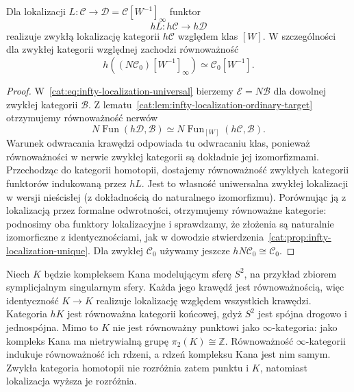 \begin{twierdzenie}\label{cat:thm:infty-localization-homotopy}
Dla lokalizacji $L:\mathcal C\to\mathcal D=\mathcal C[W^{-1}]_\infty$ funktor
\[
 hL:h\mathcal C\to h\mathcal D
\]
realizuje zwykłą lokalizację kategorii $h\mathcal C$ względem klas $[W]$. W szczególności dla zwykłej kategorii względnej zachodzi równoważność
\[
 h((N\mathcal C_0)[W^{-1}]_\infty)\simeq \mathcal C_0[W^{-1}].
\]
\end{twierdzenie}
\begin{proof}
W~\eqref{cat:eq:infty-localization-universal} bierzemy $\mathcal E=N\mathcal B$ dla dowolnej zwykłej kategorii $\mathcal B$. Z lematu~\ref{cat:lem:infty-localization-ordinary-target} otrzymujemy równoważność nerwów
\[
 N\operatorname{Fun}(h\mathcal D,\mathcal B)
 \simeq N\operatorname{Fun}_{[W]}(h\mathcal C,\mathcal B).
\]
Warunek odwracania krawędzi odpowiada tu odwracaniu klas, ponieważ równoważności w nerwie zwykłej kategorii są dokładnie jej izomorfizmami. Przechodząc do kategorii homotopii, dostajemy równoważność zwykłych kategorii funktorów indukowaną przez $hL$. Jest to własność uniwersalna zwykłej lokalizacji w wersji nieścisłej (z dokładnością do naturalnego izomorfizmu). Porównując ją z lokalizacją przez formalne odwrotności, otrzymujemy równoważne kategorie: podnosimy oba funktory lokalizacyjne i sprawdzamy, że złożenia są naturalnie izomorficzne z identycznościami, jak w dowodzie stwierdzenia~\ref{cat:prop:infty-localization-unique}. Dla zwykłej $\mathcal C_0$ używamy jeszcze $hN\mathcal C_0\cong\mathcal C_0$.
\end{proof}

\begin{przyklad}\label{cat:ex:infty-localization-higher-information}
Niech $K$ będzie kompleksem Kana modelującym sferę $S^2$, na przykład zbiorem symplicjalnym singularnym sfery. Każda jego krawędź jest równoważnością, więc identyczność $K\to K$ realizuje lokalizację względem wszystkich krawędzi. Kategoria $hK$ jest równoważna kategorii końcowej, gdyż $S^2$ jest spójna drogowo i jednospójna. Mimo to $K$ nie jest równoważny punktowi jako $\infty$-kategoria: jako kompleks Kana ma nietrywialną grupę $\pi_2(K)\cong\mathbb Z$. Równoważność $\infty$-kategorii indukuje równoważność ich rdzeni, a rdzeń kompleksu Kana jest nim samym. Zwykła kategoria homotopii nie rozróżnia zatem punktu i $K$, natomiast lokalizacja wyższa je rozróżnia.
\end{przyklad}

